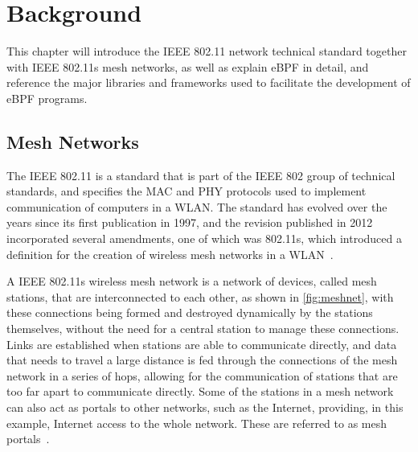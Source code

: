 \chapter{Background}\label{chap:stat}

This chapter will introduce the \ac{IEEE} 802.11 network technical standard
together with \ac{IEEE} 802.11s mesh networks, as well as explain eBPF in
detail, and reference the major libraries and frameworks used to facilitate the
development of eBPF programs.


\section{Mesh Networks}

The \ac{IEEE} 802.11 is a standard that is part of the \ac{IEEE} 802 group of
technical standards, and specifies the \ac{MAC} and \ac{PHY} protocols used to
implement communication of computers in a \ac{WLAN}. The standard has evolved
over the years since its first publication in 1997, and the revision published
in 2012 incorporated several amendments, one of which was 802.11s, which
introduced a definition for the creation of wireless mesh networks in a
\ac{WLAN}~\cite{ieee80211}.

A \ac{IEEE} 802.11s wireless mesh network is a network of devices, called mesh
stations, that are interconnected to each other, as shown in
\autoref{fig:meshnet}, with these connections being formed and destroyed
dynamically by the stations themselves, without the need for a central station
to manage these connections. Links are established when stations are able to
communicate directly, and data that needs to travel a large distance is fed
through the connections of the mesh network in a series of hops, allowing for
the communication of stations that are too far apart to communicate directly.
Some of the stations in a mesh network can also act as portals to other
networks, such as the Internet, providing, in this example, Internet access to
the whole network. These are referred to as mesh portals~\cite{meshopor}.

